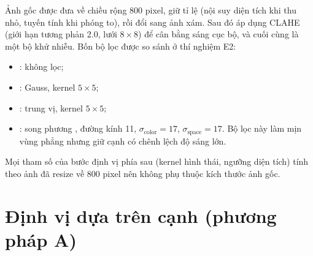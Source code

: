 Ảnh gốc được đưa về chiều rộng 800 pixel, giữ tỉ lệ (nội suy diện tích khi thu nhỏ, tuyến tính khi phóng to), rồi đổi sang ảnh xám. Sau đó áp dụng CLAHE \cite{clahe} (giới hạn tương phản 2.0, lưới $8\times 8$) để cân bằng sáng cục bộ, và cuối cùng là một bộ khử nhiễu. Bốn bộ lọc được so sánh ở thí nghiệm E2:
\begin{itemize}
  \item {}: không lọc;
  \item {}: Gauss, kernel $5\times 5$;
  \item {}: trung vị, kernel $5\times 5$;
  \item {}: song phương \cite{bilateral}, đường kính 11, $\sigma_{\text{color}}=17$, $\sigma_{\text{space}}=17$. Bộ lọc này làm mịn vùng phẳng nhưng giữ cạnh có chênh lệch độ sáng lớn.
\end{itemize}
Mọi tham số của bước định vị phía sau (kernel hình thái, ngưỡng diện tích) tính theo ảnh đã resize về 800 pixel nên không phụ thuộc kích thước ảnh gốc.

\section{Định vị dựa trên cạnh (phương pháp A)}
\label{sec:edge}

